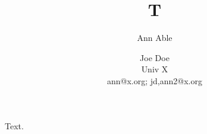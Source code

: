 \documentclass{article}
\title{T}\author{Ann Able \and Joe Doe\\ Univ X\\ ann@x.org; jd,ann2@x.org}
\begin{document}
\maketitle
Text.
\end{document}
